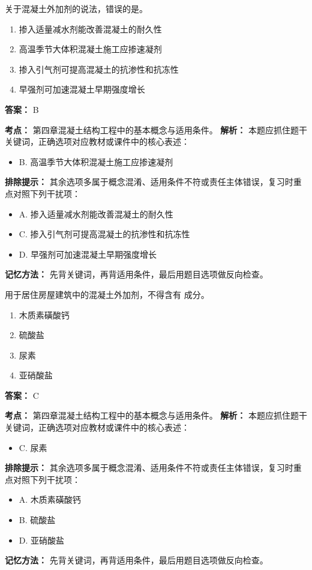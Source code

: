 \documentclass[UTF8,fontset=fandol,11pt]{ctexart}
\begin{document}
\begin{quizbox}[title={第 68 题}]
关于混凝土外加剂的说法，错误的是。\\
\begin{enumerate}[label=\Alph*.]
\item 掺入适量减水剂能改善混凝土的耐久性
\item 高温季节大体积混凝土施工应掺速凝剂
\item 掺入引气剂可提高混凝土的抗渗性和抗冻性
\item 早强剂可加速混凝土早期强度增长
\end{enumerate}
\textbf{答案：} B
\vspace{0.25em}
\begin{answerbox}[title={考点解析}]
\textbf{考点：} 第四章混凝土结构工程中的基本概念与适用条件。
\textbf{解析：} 本题应抓住题干关键词，正确选项对应教材或课件中的核心表述：
\begin{itemize}
\item B. 高温季节大体积混凝土施工应掺速凝剂
\end{itemize}
\textbf{排除提示：} 其余选项多属于概念混淆、适用条件不符或责任主体错误，复习时重点对照下列干扰项：
\begin{itemize}
\item A. 掺入适量减水剂能改善混凝土的耐久性
\item C. 掺入引气剂可提高混凝土的抗渗性和抗冻性
\item D. 早强剂可加速混凝土早期强度增长
\end{itemize}
\textbf{记忆方法：} 先背关键词，再背适用条件，最后用题目选项做反向检查。
\end{answerbox}
\end{quizbox}

\begin{quizbox}[title={第 69 题}]
用于居住房屋建筑中的混凝土外加剂，不得含有 成分。\\
\begin{enumerate}[label=\Alph*.]
\item 木质素磺酸钙
\item 硫酸盐
\item 尿素
\item 亚硝酸盐
\end{enumerate}
\textbf{答案：} C
\vspace{0.25em}
\begin{answerbox}[title={考点解析}]
\textbf{考点：} 第四章混凝土结构工程中的基本概念与适用条件。
\textbf{解析：} 本题应抓住题干关键词，正确选项对应教材或课件中的核心表述：
\begin{itemize}
\item C. 尿素
\end{itemize}
\textbf{排除提示：} 其余选项多属于概念混淆、适用条件不符或责任主体错误，复习时重点对照下列干扰项：
\begin{itemize}
\item A. 木质素磺酸钙
\item B. 硫酸盐
\item D. 亚硝酸盐
\end{itemize}
\textbf{记忆方法：} 先背关键词，再背适用条件，最后用题目选项做反向检查。
\end{answerbox}
\end{quizbox}
\end{document}

